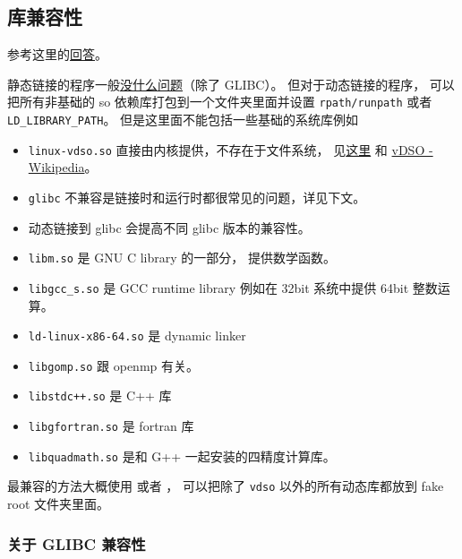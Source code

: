 \subsection{库兼容性}
参考这里的\href{https://stackoverflow.com/questions/20183883/determining-binary-compatibility-under-linux}{回答}。

静态链接的程序一般\href{https://stackoverflow.com/questions/31801824/is-static-linking-in-linux-portable}{没什么问题}（除了 GLIBC）。 但对于动态链接的程序， 可以把所有非基础的 so 依赖库打包到一个文件夹里面并设置 \verb`rpath/runpath` 或者 \verb`LD_LIBRARY_PATH`。 但是这里面不能包括一些基础的系统库例如
\begin{itemize}
\item \verb`linux-vdso.so` 直接由内核提供，不存在于文件系统， 见\href{https://unix.stackexchange.com/questions/476971/ldd-shows-no-location-after-arrow-library-does-not-exist-on-system}{这里} 和 \href{https://en.wikipedia.org/wiki/VDSO}{vDSO - Wikipedia}。
\item \verb`glibc` 不兼容是链接时和运行时都很常见的问题，详见下文。
\item 动态链接到 glibc 会提高不同 glibc 版本的兼容性。
\item \verb`libm.so` 是 GNU C library 的一部分， 提供数学函数。
\item \verb`libgcc_s.so` 是 GCC runtime library 例如在 32bit 系统中提供 64bit 整数运算。
\item \verb`ld-linux-x86-64.so` 是 dynamic linker
\item \verb`libgomp.so` 跟 openmp 有关。
\item \verb`libstdc++.so` 是 C++ 库
\item \verb`libgfortran.so` 是 fortran 库
\item \verb`libquadmath.so` 是和 G++ 一起安装的四精度计算库。
\end{itemize}

最兼容的方法大概使用  或者 ， 可以把除了 \verb`vdso` 以外的所有动态库都放到 fake root 文件夹里面。

\subsubsection{关于 GLIBC 兼容性}

